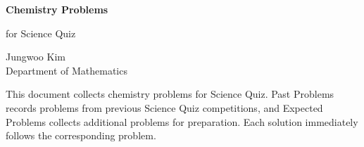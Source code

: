 \documentclass[11pt,oneside]{article}
\begin{document}
    \thispagestyle{empty}

    \begin{center}
        \vspace*{1.1cm}

        {\LARGE\bfseries Chemistry Problems\par}

        \vspace{0.25cm}

        {\large for Science Quiz\par}

        \vspace{0.75cm}

        {\normalsize
        Jungwoo Kim\\
        Department of Mathematics\\
        \PohangUniversityOfScienceAndTechnology
        \par}

    \end{center}

    \vspace{0.45cm}

    This document collects chemistry problems for Science Quiz. Past Problems
    records problems from previous Science Quiz competitions, and Expected
    Problems collects additional problems for preparation. Each solution
    immediately follows the corresponding problem.

    \vspace{0.45cm}

    \tableofcontents

    
    
\end{document}
